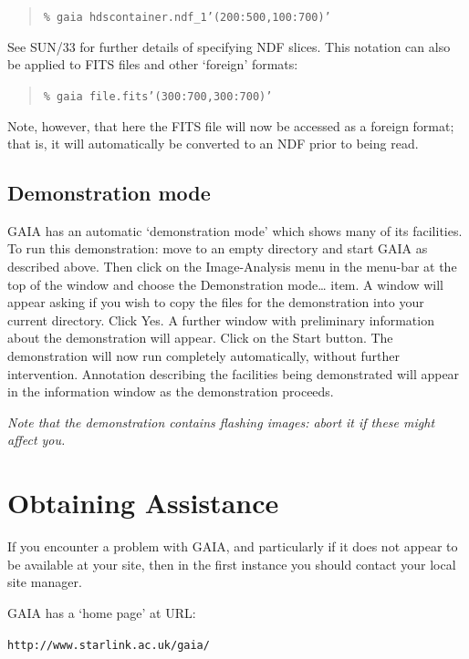 \documentclass[twoside,11pt]{article}
\newcommand{\htmladdnormallink}[2]{#1}
\newcommand{\xref}[3]{#1}
\newcommand{\xlabel}[1]{}
\begin{document}
\begin{quote}
{\tt \% gaia hdscontainer.ndf\_1'(200:500,100:700)'}
\end{quote}

See \xref{SUN/33}{sun33}{}\cite{SUN33} for further details of specifying
NDF slices.  This notation can also be applied to FITS files and other
`foreign' formats:

\begin{quote}
{\tt \% gaia file.fits'(300:700,300:700)'}
\end{quote}

Note, however, that here the FITS file will now be accessed as a foreign
format; that is, it will automatically be converted to an NDF prior to
being read.

\subsection{Demonstration mode}

GAIA has an automatic `demonstration mode' which shows many of its
facilities.  To run this demonstration: move to an empty directory and
start GAIA as described above.  Then click on the {\sf Image-Analysis} menu
in the menu-bar at the top of the window and choose the {\sf Demonstration
mode\ldots} item.  A window will appear asking if you wish to copy the
files for the demonstration into your current directory.  Click {\sf
Yes}.  A further window with preliminary information about the demonstration
will appear.  Click on the {\sf Start} button.  The demonstration will now
run completely automatically, without further intervention.  Annotation
describing the facilities being demonstrated will appear in the
information window as the demonstration proceeds.

{\it Note that the demonstration contains flashing images: abort it if
these might affect you.}


\section{\xlabel{ASSIST}\label{ASSIST}Obtaining  Assistance}

If you encounter a problem with GAIA, and particularly if it does not appear
to be available at your site, then in the first instance you should contact
your local site manager.

GAIA has a `home page' at URL:

\begin{center}
\htmladdnormallink{{\tt http://www.starlink.ac.uk/gaia/}}
{http://www.starlink.ac.uk/gaia/}
\end{center}
\end{document}
